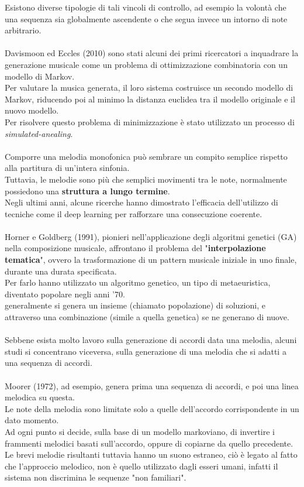 \documentclass[a4paper,12pt]{report}
\begin{document}
Esistono diverse tipologie di tali vincoli di controllo, ad esempio la volontà che una sequenza sia globalmente ascendente o che segua invece un intorno di note arbitrario. \\
\\
Davismoon ed Eccles (2010) sono stati alcuni dei primi ricercatori a inquadrare la generazione musicale come un problema di ottimizzazione combinatoria con un modello di Markov.  \\
Per valutare la musica generata, il loro sistema costruisce un secondo modello di Markov, riducendo poi al minimo la distanza euclidea tra il modello originale e il nuovo modello.  \\
Per risolvere questo problema di minimizzazione è stato utilizzato un processo di \textit{simulated-anealing}. \\
\\
Comporre una melodia monofonica può sembrare un compito semplice rispetto alla partitura di un'intera sinfonia. \\
Tuttavia, le melodie sono più che semplici movimenti tra le note, normalmente possiedono una \textbf{struttura a lungo termine}. \\
Negli ultimi anni, alcune ricerche hanno dimostrato l’efficacia dell’utilizzo di tecniche come il deep learning per rafforzare una consecuzione coerente. \\
\\
Horner e Goldberg (1991), pionieri nell'applicazione degli algoritmi genetici (GA) nella composizione musicale, affrontano il problema del "\textbf{interpolazione tematica}", ovvero la trasformazione di un pattern musicale iniziale in uno finale, durante una durata specificata. \\
Per farlo hanno utilizzato un algoritmo genetico, un tipo di metaeuristica, diventato popolare negli anni '70. \\
generalmente si genera un insieme (chiamato popolazione) di soluzioni, e attraverso una combinazione (simile a quella genetica) se ne generano di nuove. \\
\\
Sebbene esista molto lavoro sulla generazione di accordi data una melodia, alcuni studi si concentrano viceversa, sulla generazione di una melodia che si adatti a una sequenza di accordi. \\
\\
Moorer (1972), ad esempio, genera prima una sequenza di accordi, e poi una linea melodica su questa. \\
Le note della melodia sono limitate solo a quelle dell'accordo corrispondente in un dato momento. \\
Ad ogni punto si decide, sulla base di un modello markoviano, di invertire i frammenti melodici basati sull'accordo, oppure di copiarne da quello precedente. \\
Le brevi melodie risultanti tuttavia hanno un suono estraneo, ciò è legato al fatto che l'approccio melodico, non è quello utilizzato dagli esseri umani, infatti il sistema non discrimina le sequenze "non familiari". 
\end{document}
